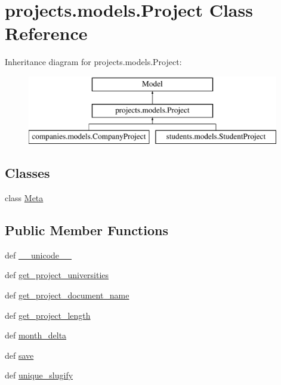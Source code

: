 \hypertarget{classprojects_1_1models_1_1_project}{\section{projects.\-models.\-Project Class Reference}
\label{classprojects_1_1models_1_1_project}
}
Inheritance diagram for projects.\-models.\-Project\-:\begin{figure}[H]
\begin{center}
\leavevmode
\includegraphics[height=3.000000cm]{classprojects_1_1models_1_1_project}
\end{center}
\end{figure}
\subsection*{Classes}
\begin{DoxyCompactItemize}
\item 
class \hyperlink{classprojects_1_1models_1_1_project_1_1_meta}{Meta}
\end{DoxyCompactItemize}
\subsection*{Public Member Functions}
\begin{DoxyCompactItemize}
\item 
def \hyperlink{classprojects_1_1models_1_1_project_a1e9fea89691e7c315b6411ec12991ea3}{\-\_\-\-\_\-unicode\-\_\-\-\_\-}
\item 
def \hyperlink{classprojects_1_1models_1_1_project_a29808808540bab887c2d7e8223b1e570}{get\-\_\-project\-\_\-universities}
\item 
def \hyperlink{classprojects_1_1models_1_1_project_aa145ebb35f3d7bb188fe9cafed84f331}{get\-\_\-project\-\_\-document\-\_\-name}
\item 
def \hyperlink{classprojects_1_1models_1_1_project_a80a6463012c148ed8e8a4e9c0f8319e7}{get\-\_\-project\-\_\-length}
\item 
def \hyperlink{classprojects_1_1models_1_1_project_a0d5cdbfc1fc497eeef3a3b986b78cef6}{month\-\_\-delta}
\item 
def \hyperlink{classprojects_1_1models_1_1_project_a00a7c4dc3e2cf6d184133869091c7961}{save}
\item 
def \hyperlink{classprojects_1_1models_1_1_project_ad675cb4b7de18dbed7997efd1e6d0d5f}{unique\-\_\-slugify}
\end{DoxyCompactItemize}
